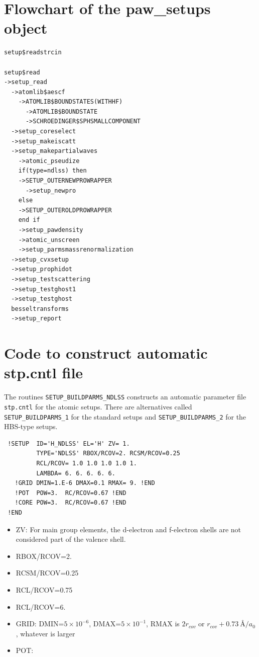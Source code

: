 \documentclass[11pt,a4paper]{report}
\begin{document}
\section{Flowchart of the paw\_setups object}
\begin{verbatim}
setup$readstrcin

setup$read
->setup_read
  ->atomlib$aescf
    ->ATOMLIB$BOUNDSTATES(WITHHF)
      ->ATOMLIB$BOUNDSTATE
      ->SCHROEDINGER$SPHSMALLCOMPONENT
  ->setup_coreselect
  ->setup_makeiscatt
  ->setup_makepartialwaves
    ->atomic_pseudize
    if(type=ndlss) then
    ->SETUP_OUTERNEWPROWRAPPER
      ->setup_newpro
    else
    ->SETUP_OUTEROLDPROWRAPPER
    end if
    ->setup_pawdensity
    ->atomic_unscreen
    ->setup_parmsmassrenormalization
  ->setup_cvxsetup
  ->setup_prophidot
  ->setup_testscattering
  ->setup_testghost1
  ->setup_testghost
  besseltransforms
  ->setup_report
\end{verbatim}


\section{Code to construct automatic stp.cntl file}
The routines \verb|SETUP_BUILDPARMS_NDLSS| constructs an automatic
parameter file \verb|stp.cntl| for the atomic setups. There are
alternatives called \verb|SETUP_BUILDPARMS_1| for the standard setups
and \verb|SETUP_BUILDPARMS_2| for the HBS-type setups.



\begin{verbatim}
 !SETUP  ID='H_NDLSS' EL='H' ZV= 1.
         TYPE='NDLSS' RBOX/RCOV=2. RCSM/RCOV=0.25
         RCL/RCOV= 1.0 1.0 1.0 1.0 1.
         LAMBDA= 6. 6. 6. 6. 6.
   !GRID DMIN=1.E-6 DMAX=0.1 RMAX= 9. !END
   !POT  POW=3.  RC/RCOV=0.67 !END
   !CORE POW=3.  RC/RCOV=0.67 !END
 !END
\end{verbatim}

\begin{itemize}
\item ZV: For main group elements, the d-electron and f-electron
  shells are not considered part of the valence shell.
\item RBOX/RCOV=2.
\item RCSM/RCOV=0.25
\item RCL/RCOV=0.75
\item RCL/RCOV=6.
\item GRID: DMIN=$5\times 10^{-6}$,
DMAX=$5\times 10^{-1}$,
RMAX is $2r_{cov}$ or $r_{cov}+0.73~${\AA}$/a_0$, whatever is larger
\item POT:
\end{itemize}
\end{document}
